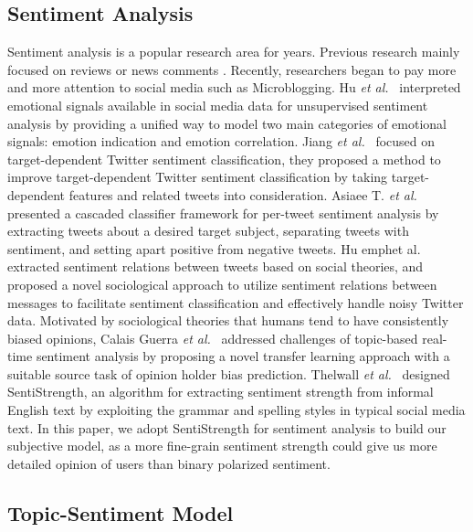 \documentclass{acm_proc_article-sp}
\begin{document}
\subsection{Sentiment Analysis}
Sentiment analysis is a popular research area for years. Previous research mainly focused on reviews or news comments \cite{pang2008opinion}. 
Recently, researchers began to pay more and more attention to social media such as Microblogging. 
Hu \emph{et al.}~\cite{hu2013unsupervised} interpreted emotional signals available in social media data for unsupervised sentiment analysis by providing a unified way to model two main categories of emotional signals: emotion indication and emotion correlation. 
Jiang \emph{et al.}~\cite{jiang2011target} focused on target-dependent Twitter sentiment classification, they proposed a method to improve target-dependent Twitter sentiment classification by taking target-dependent features and related tweets into consideration. 
Asiaee T. \emph{et al.}~\cite{asiaee2012if} presented a cascaded classifier framework for per-tweet sentiment analysis by extracting tweets about a desired target subject, separating tweets with sentiment, and setting apart positive from negative tweets.
Hu emph{et al.}~\cite{hu2013exploiting} extracted sentiment relations between tweets based on social theories, and proposed a novel sociological approach to utilize sentiment relations between messages to facilitate sentiment classification and effectively handle noisy Twitter data.
Motivated by sociological theories that humans tend to have consistently biased opinions, Calais Guerra \emph{et al.}~\cite{calais2011bias} addressed challenges of topic-based real-time sentiment analysis by proposing a novel transfer learning approach with a suitable source task of opinion holder bias prediction.
Thelwall \emph{et al.}~\cite{thelwall2010sentiment,thelwall2012sentiment} designed SentiStrength, an algorithm for extracting sentiment strength from informal English text by exploiting the grammar and spelling styles in typical social media text.
In this paper, we adopt SentiStrength for sentiment analysis to build our subjective model, as a more fine-grain sentiment strength could give us more detailed opinion of users than binary polarized sentiment.

\subsection{Topic-Sentiment Model}
\end{document}
